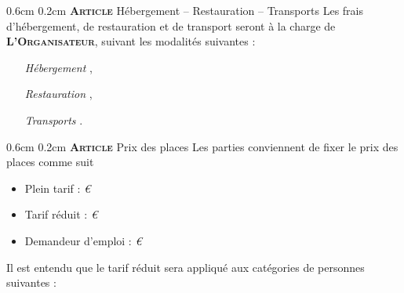 \documentclass[a4paper,10pt]{article}
\makeatletter
\newcommand{\OR}{\textbf{\textsc{L'Organisateur}}}
\renewcommand\section{\@startsection{section}{1}{\z@}%
	{0.6cm}%
	{0.2cm}%
	{\noindent\large\bfseries\scshape Article }}
\makeatother
\begin{document}
\section{H\'ebergement -- Restauration -- Transports}
\label{sec:heb_rest_transp}
Les frais d'h\'ebergement, de restauration et de transport seront \`a
la charge de \OR , suivant les modalit\'es suivantes :
\begin{itemize}
    \item [\emph{H\'ebergement}]
    ,
    \item [\emph{Restauration}]
    ,
    \item [\emph{Transports}] .
\end{itemize}

\section{Prix des places}
\label{sec:prix_places}
Les parties conviennent de fixer le prix des places comme suit
\begin{itemize}
    \item Plein tarif : \emph{\PrestationTarifPlein{} \euro}
    \item Tarif r\'eduit : \emph{\PrestationTarifReduit{} \euro}
    \item Demandeur d'emploi : \emph{\PrestationTarifDemandeurEmploi{}
      \euro}
\end{itemize}
Il est entendu que le tarif r\'eduit sera appliqu\'e aux cat\'egories
de personnes suivantes : \emph{\PrestationTarifCategoriesReduit{}}
\end{document}
